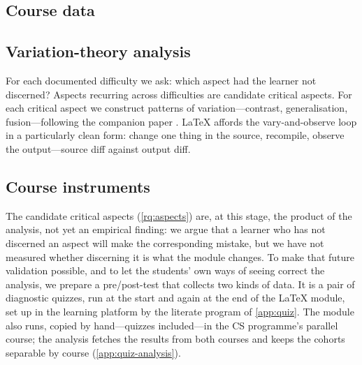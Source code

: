 \subsection{Course data}
\label{sec:method-course-data}


\subsection{Variation-theory analysis}
\label{sec:method-vt-analysis}

For each documented difficulty we ask: which aspect had the learner not
discerned?
Aspects recurring across difficulties are candidate critical aspects.
For each critical aspect we construct patterns of variation---contrast,
generalisation, fusion---following the companion paper
\autocite{VTProgMisconceptions}.
LaTeX affords the vary-and-observe loop
\autocite{Svensson2020Affordances,ThuneEckerdal2009Variation,
ThuneEckerdal2018Lab} in a particularly clean form: change one thing in
the source, recompile, observe the output---source diff against output
diff.

\subsection{Course instruments}
\label{sec:method-instruments}

The candidate critical aspects (\cref{rq:aspects}) are, at this stage, the
product of the analysis, not yet an empirical finding: we argue that a
learner who has not discerned an aspect will make the corresponding
mistake, but we have not measured whether discerning it is what the module
changes.
To make that future validation possible, and to let the students' own
ways of seeing correct the analysis, we prepare a pre/post-test that
collects two kinds of data.
It is a pair of diagnostic quizzes, run at the start and again at the end
of the LaTeX module, set up in the learning platform by the literate
program of \cref{app:quiz}.
The module also runs, copied by hand---quizzes included---in the CS
programme's parallel course; the analysis fetches the results from both
courses and keeps the cohorts separable by course
(\cref{app:quiz-analysis}).

